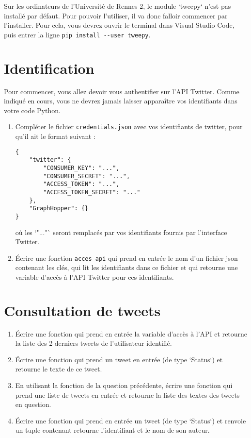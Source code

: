 \documentclass[11pt,a4paper]{article}
\begin{document}
Sur les ordinateurs de l'Université de Rennes 2, le module `tweepy` n'est pas installé par défaut. Pour pouvoir l'utiliser, il va donc falloir commencer par l'installer. Pour cela, vous devrez ouvrir le terminal dans Visual Studio Code, puis entrer la ligne \verb+pip install --user tweepy+.

\section{Identification}

Pour commencer, vous allez devoir vous authentifier sur l'API Twitter. Comme indiqué en cours, vous ne devrez jamais laisser apparaître vos identifiants dans votre code Python.

\begin{enumerate}
    \item Compléter le fichier \verb+credentials.json+ avec vos identifiants de twitter, pour qu'il ait le format suivant : 
\begin{verbatim}
{
    "twitter": {
        "CONSUMER_KEY": "...",
        "CONSUMER_SECRET": "...",
        "ACCESS_TOKEN": "...",
        "ACCESS_TOKEN_SECRET": "..."
    },
    "GraphHopper": {}
}

\end{verbatim}
où les `"..."` seront remplacés par vos identifiants fournis par l'interface Twitter.
\item Écrire une fonction \verb+acces_api+ qui prend en entrée le nom d'un fichier json contenant les clés, qui lit les identifiants dans ce fichier et qui retourne une variable d'accès à l'API Twitter pour ces identifiants.
\end{enumerate}

\section{Consultation de tweets}
\begin{enumerate}
    
    
\item  Écrire une fonction qui prend en entrée la variable d'accès à l'API et retourne la liste des 2 derniers tweets de l'utilisateur identifié.

\item Écrire une fonction qui prend un tweet en entrée (de type `Status`) et retourne le texte de ce tweet.

\item En utilisant la fonction de la question précédente, écrire une fonction qui prend une liste de tweets en entrée et retourne la liste des textes des tweets en question.

\item Écrire une fonction qui prend en entrée un tweet (de type `Status`) et renvoie un tuple contenant retourne l'identifiant et le nom de son auteur.

\end{enumerate}
\end{document}
